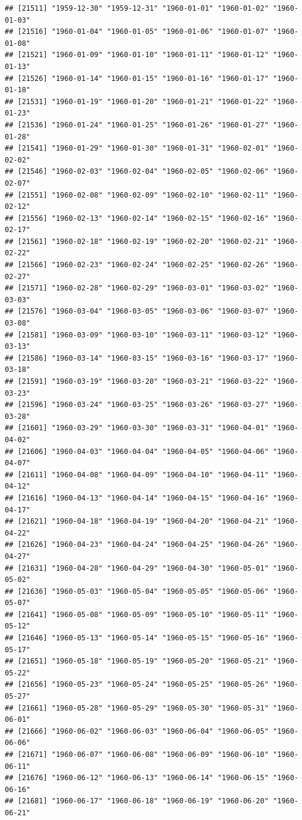 \documentclass{article}\usepackage[]{graphicx}\usepackage[]{color}
\makeatletter
\newenvironment{kframe}{%
 \def\at@end@of@kframe{}%
 \ifinner\ifhmode%
  \def\at@end@of@kframe{\end{minipage}}%
  \begin{minipage}{\columnwidth}%
 \fi\fi%
 \def\FrameCommand##1{\hskip\@totalleftmargin \hskip-\fboxsep
 \colorbox{shadecolor}{##1}\hskip-\fboxsep
     \hskip-\linewidth \hskip-\@totalleftmargin \hskip\columnwidth}%
 \MakeFramed {\advance\hsize-\width
   \@totalleftmargin\z@ \linewidth\hsize
   \@setminipage}}%
 {\par\unskip\endMakeFramed%
 \at@end@of@kframe}
\newenvironment{knitrout}{}{} %
\makeatother
\begin{document}
\begin{description}
\begin{knitrout}
\begin{kframe}
\begin{verbatim}
## [21511] "1959-12-30" "1959-12-31" "1960-01-01" "1960-01-02" "1960-01-03"
## [21516] "1960-01-04" "1960-01-05" "1960-01-06" "1960-01-07" "1960-01-08"
## [21521] "1960-01-09" "1960-01-10" "1960-01-11" "1960-01-12" "1960-01-13"
## [21526] "1960-01-14" "1960-01-15" "1960-01-16" "1960-01-17" "1960-01-18"
## [21531] "1960-01-19" "1960-01-20" "1960-01-21" "1960-01-22" "1960-01-23"
## [21536] "1960-01-24" "1960-01-25" "1960-01-26" "1960-01-27" "1960-01-28"
## [21541] "1960-01-29" "1960-01-30" "1960-01-31" "1960-02-01" "1960-02-02"
## [21546] "1960-02-03" "1960-02-04" "1960-02-05" "1960-02-06" "1960-02-07"
## [21551] "1960-02-08" "1960-02-09" "1960-02-10" "1960-02-11" "1960-02-12"
## [21556] "1960-02-13" "1960-02-14" "1960-02-15" "1960-02-16" "1960-02-17"
## [21561] "1960-02-18" "1960-02-19" "1960-02-20" "1960-02-21" "1960-02-22"
## [21566] "1960-02-23" "1960-02-24" "1960-02-25" "1960-02-26" "1960-02-27"
## [21571] "1960-02-28" "1960-02-29" "1960-03-01" "1960-03-02" "1960-03-03"
## [21576] "1960-03-04" "1960-03-05" "1960-03-06" "1960-03-07" "1960-03-08"
## [21581] "1960-03-09" "1960-03-10" "1960-03-11" "1960-03-12" "1960-03-13"
## [21586] "1960-03-14" "1960-03-15" "1960-03-16" "1960-03-17" "1960-03-18"
## [21591] "1960-03-19" "1960-03-20" "1960-03-21" "1960-03-22" "1960-03-23"
## [21596] "1960-03-24" "1960-03-25" "1960-03-26" "1960-03-27" "1960-03-28"
## [21601] "1960-03-29" "1960-03-30" "1960-03-31" "1960-04-01" "1960-04-02"
## [21606] "1960-04-03" "1960-04-04" "1960-04-05" "1960-04-06" "1960-04-07"
## [21611] "1960-04-08" "1960-04-09" "1960-04-10" "1960-04-11" "1960-04-12"
## [21616] "1960-04-13" "1960-04-14" "1960-04-15" "1960-04-16" "1960-04-17"
## [21621] "1960-04-18" "1960-04-19" "1960-04-20" "1960-04-21" "1960-04-22"
## [21626] "1960-04-23" "1960-04-24" "1960-04-25" "1960-04-26" "1960-04-27"
## [21631] "1960-04-28" "1960-04-29" "1960-04-30" "1960-05-01" "1960-05-02"
## [21636] "1960-05-03" "1960-05-04" "1960-05-05" "1960-05-06" "1960-05-07"
## [21641] "1960-05-08" "1960-05-09" "1960-05-10" "1960-05-11" "1960-05-12"
## [21646] "1960-05-13" "1960-05-14" "1960-05-15" "1960-05-16" "1960-05-17"
## [21651] "1960-05-18" "1960-05-19" "1960-05-20" "1960-05-21" "1960-05-22"
## [21656] "1960-05-23" "1960-05-24" "1960-05-25" "1960-05-26" "1960-05-27"
## [21661] "1960-05-28" "1960-05-29" "1960-05-30" "1960-05-31" "1960-06-01"
## [21666] "1960-06-02" "1960-06-03" "1960-06-04" "1960-06-05" "1960-06-06"
## [21671] "1960-06-07" "1960-06-08" "1960-06-09" "1960-06-10" "1960-06-11"
## [21676] "1960-06-12" "1960-06-13" "1960-06-14" "1960-06-15" "1960-06-16"
## [21681] "1960-06-17" "1960-06-18" "1960-06-19" "1960-06-20" "1960-06-21"

\end{verbatim}
\end{kframe}
\end{knitrout}
\end{description}
\end{document}
